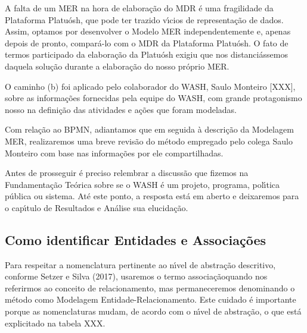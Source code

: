 \documentclass[
12pt,		%
openright,	%
twoside,  %
a4paper,			%
chapter=TITLE,		%
english,			%
french,				%
spanish,			%
brazil				%
]{USPSC-classe/USPSC}
\begin{document}
A falta de um MER na hora de elabora\c{c}\~ao do MDR \'e uma fragilidade da Plataforma Platu\'osh, que pode ter trazido v\'{\i}cios de representa\c{c}\~ao de dados. Assim, optamos por desenvolver o Modelo MER independentemente e, apenas depois de pronto, compar\'a-lo com o MDR da Plataforma Platu\'osh. O fato de termos participado da elabora\c{c}\~ao da Platu\'osh exigiu que nos distanci\'assemos daquela solu\c{c}\~ao durante a elabora\c{c}\~ao do nosso pr\'oprio MER.










O caminho (b) foi aplicado pelo colaborador do WASH, Saulo Monteiro [XXX], sobre as informa\c{c}\~oes fornecidas pela equipe do WASH, com grande protagonismo nosso na defini\c{c}\~ao das atividades e a\c{c}\~oes que foram modeladas.










Com rela\c{c}\~ao ao BPMN, adiantamos que em seguida \`a descri\c{c}\~ao da Modelagem MER, realizaremos uma breve revis\~ao do m\'etodo empregado pelo colega Saulo Monteiro com base nas informa\c{c}\~oes por ele compartilhadas.










Antes de prosseguir \'e preciso relembrar a discuss\~ao que fizemos na Fundamenta\c{c}\~ao Te\'orica sobre se o WASH \'e um projeto, programa, pol\'{\i}tica p\'ublica ou sistema. At\'e este ponto, a resposta est\'a em aberto e deixaremos para o cap\'{\i}tulo de Resultados e An\'alise sua elucida\c{c}\~ao.










\subsection[Como identificar Entidades e Associa\c{c}\~oes]{Como identificar Entidades e Associa\c{c}\~oes}\label{Como identificar Entidades e Associa\c{c}\~oes}
Para respeitar a nomenclatura pertinente ao n\'{\i}vel de abstra\c{c}\~ao descritivo, conforme  Setzer e Silva (2017), usaremos o termo \textquotedbl associa\c{c}\~ao\textquotedbl  quando nos referirmos ao conceito de \textquotedbl relacionamento\textquotedbl , mas permaneceremos denominando o m\'etodo como \textquotedbl Modelagem Entidade-Relacionamento\textquotedbl . Este cuidado \'e importante porque as nomenclaturas mudam, de acordo com o n\'{\i}vel de abstra\c{c}\~ao, o que est\'a explicitado na tabela XXX.
\end{document}
